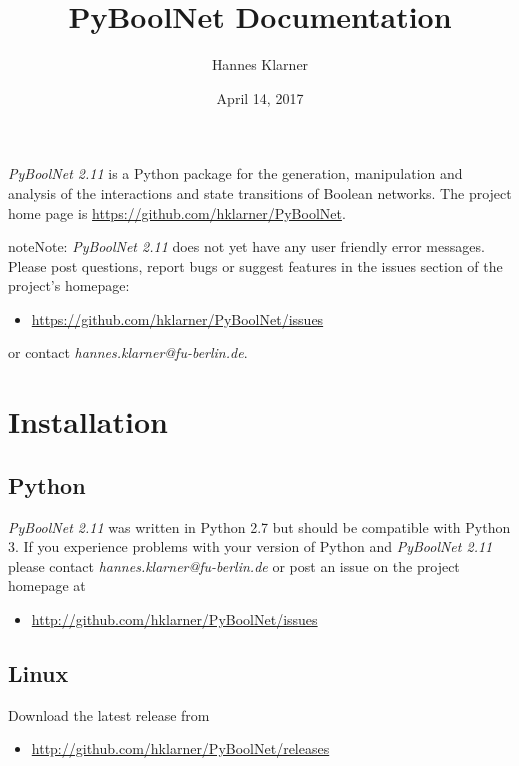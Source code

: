 \documentclass[letterpaper,10pt,english]{sphinxmanual}
\title{PyBoolNet Documentation}
\date{April 14, 2017}
\author{Hannes Klarner}
\begin{document}
\maketitle
\tableofcontents
{}\label{index::doc}
\emph{PyBoolNet 2.11} is a Python package for the generation, manipulation and analysis of the interactions and state transitions of Boolean networks.
The project home page is \href{https://github.com/hklarner/PyBoolNet}{https://github.com/hklarner/PyBoolNet}.

\begin{notice}{note}{Note:}
\emph{PyBoolNet 2.11} does not yet have any user friendly error messages.
Please post questions, report bugs or suggest features in the issues section of the project's homepage:
\begin{itemize}
\item {} 
\href{https://github.com/hklarner/PyBoolNet/issues}{https://github.com/hklarner/PyBoolNet/issues}

\end{itemize}

or contact \emph{hannes.klarner@fu-berlin.de}.
\end{notice}




\chapter{Installation}
\label{Installation:installation}\label{Installation:id1}\label{Installation::doc}\label{Installation:installation-software}

\section{Python}
\label{Installation:python}
\emph{PyBoolNet 2.11} was written in Python 2.7 but should be compatible with Python 3.
If you experience problems with your version of Python and \emph{PyBoolNet 2.11} please contact \emph{hannes.klarner@fu-berlin.de} or
post an issue on the project homepage at
\begin{itemize}
\item {} 
\href{http://github.com/hklarner/PyBoolNet/issues}{http://github.com/hklarner/PyBoolNet/issues}

\end{itemize}


\section{Linux}
\label{Installation:linux}
Download the latest release from
\begin{itemize}
\item {} 
\href{http://github.com/hklarner/PyBoolNet/releases}{http://github.com/hklarner/PyBoolNet/releases}

\end{itemize}
\end{document}

